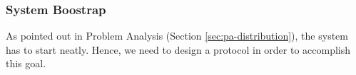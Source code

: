 



\subsubsection{System Boostrap}
As pointed out in Problem Analysis (Section \ref{sec:pa-distribution}),
the system has
to start neatly. Hence, we need to design a protocol in order to accomplish
this goal.

